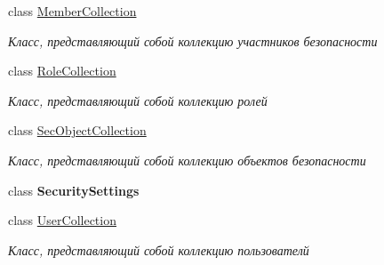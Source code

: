 \begin{DoxyCompactItemize}
class \hyperlink{class_security_1_1_entity_framework_1_1_collections_1_1_member_collection}{Member\+Collection}
\begin{DoxyCompactList}\small\item\em Класс, представляющий собой коллекцию участников безопасности \end{DoxyCompactList}\item 
class \hyperlink{class_security_1_1_entity_framework_1_1_collections_1_1_role_collection}{Role\+Collection}
\begin{DoxyCompactList}\small\item\em Класс, представляющий собой коллекцию ролей \end{DoxyCompactList}\item 
class \hyperlink{class_security_1_1_entity_framework_1_1_collections_1_1_sec_object_collection}{Sec\+Object\+Collection}
\begin{DoxyCompactList}\small\item\em Класс, представляющий собой коллекцию объектов безопасности \end{DoxyCompactList}\item 
class {\bfseries Security\+Settings}
\item 
class \hyperlink{class_security_1_1_entity_framework_1_1_collections_1_1_user_collection}{User\+Collection}
\begin{DoxyCompactList}\small\item\em Класс, представляющий собой коллекцию пользователй \end{DoxyCompactList}\end{DoxyCompactItemize}
